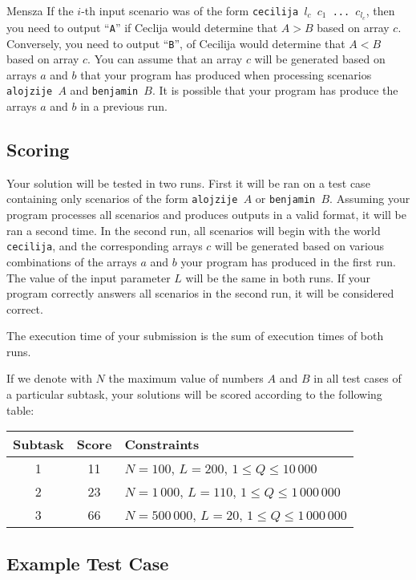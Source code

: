 \begin{statement}[
  problempoints=100,
  timelimit=5 seconds,
  memorylimit=512 MiB,
]{Mensza}
If the $i$-th input scenario was of the form \texttt{cecilija $l_c$ $c_1$ ...
$c_{l_c}$}, then you need to output ``\texttt{A}'' if Ceclija would determine
that $A > B$ based on array $c$. Conversely, you need to output ``\texttt{B}'',
of Cecilija would determine that $A < B$ based on array $c$. You can assume that
an array $c$ will be generated based on arrays $a$ and $b$ that your program has
produced when processing scenarios \texttt{alojzije $A$} and \texttt{benjamin $B$}.
It is possible that your program has produce the arrays $a$ and $b$ in a previous
run.

\subsection*{Scoring}
Your solution will be tested in two runs. First it will be ran on a test case
containing only scenarios of the form  \texttt{alojzije $A$} or
\texttt{benjamin $B$}. Assuming your program processes all scenarios and produces
outputs in a valid format, it will be ran a second time. In the second run, all
scenarios will begin with the world \texttt{cecilija}, and the corresponding
arrays $c$ will be generated based on various combinations of the arrays $a$
and $b$ your program has produced in the first run. The value of the input parameter
$L$ will be the same in both runs. If your program correctly answers all scenarios
in the second run, it will be considered correct.

The execution time of your submission is the sum of execution times of both runs.

If we denote with $N$ the maximum value of numbers $A$ and $B$ in all test cases
of a particular subtask, your solutions will be scored according to the following
table:

{\renewcommand{\arraystretch}{1.4}
  \setlength{\tabcolsep}{6pt}
  \begin{tabular}{ccl}
   Subtask & Score & Constraints \\ \midrule
    1 & 11 & $N = 100$, $L = 200$, $1 \le Q \le 10\,000$ \\
    2 & 23 & $N = 1\,000$, $L = 110$, $1 \le Q \le 1\,000\,000$ \\
    3 & 66 & $N = 500\,000$, $L = 20$, $1 \le Q \le 1\,000\,000$
\end{tabular}}

\subsection*{Example Test Case}

\end{statement}
